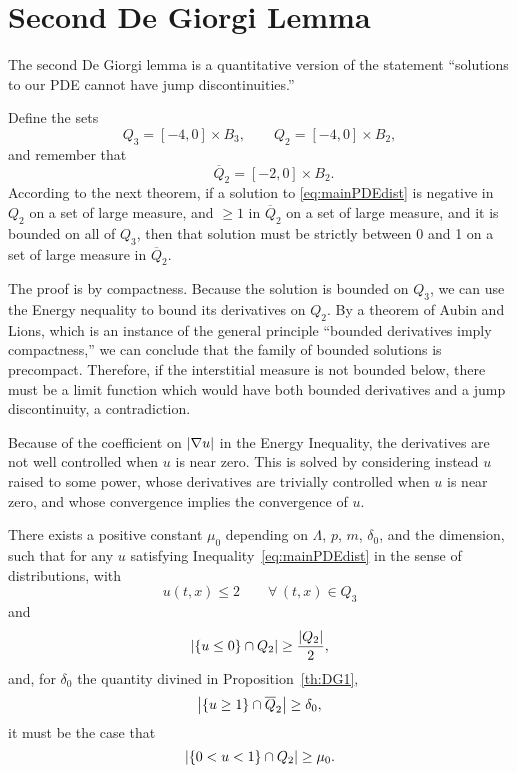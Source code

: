 \section{Second De Giorgi Lemma} \label{sec:DG2}


The second De Giorgi lemma is a quantitative version of the statement ``solutions to our PDE cannot have jump discontinuities.''  

Define the sets
\[ Q_3 = [-4,0]\times B_3, \qquad Q_2 = [-4,0]\times B_2, \]
and remember that 
\[ \qquad \overline{Q}_2 = [-2,0]\times B_2.\]  
According to the next theorem, if a solution to \eqref{eq:mainPDEdist} is negative in $Q_2$ on a set of large measure, and $\geq 1$ in $\overline{Q}_2$ on a set of large measure, and it is bounded on all of $Q_3$, then that solution must be strictly between 0 and 1 on a set of large measure in $\overline{Q}_2$.  

The proof is by compactness.  Because the solution is bounded on $Q_3$, we can use the Energy nequality to bound its derivatives on $Q_2$.  By a theorem of Aubin and Lions, which is an instance of the general principle ``bounded derivatives imply compactness,'' we can conclude that the family of bounded solutions is precompact.  Therefore, if the interstitial measure is not bounded below, there must be a limit function which would have both bounded derivatives and a jump discontinuity, a contradiction.  

Because of the coefficient on $|\nabla u|$ in the Energy Inequality, the derivatives are not well controlled when $u$ is near zero.  This is solved by considering instead $u$ raised to some power, whose derivatives are trivially controlled when $u$ is near zero, and whose convergence implies the convergence of $u$.  

\begin{proposition}\label{th:DG2}
There exists a positive constant $\mu_0$ depending on $\Lambda$, $p$, $m$, $\delta_0$, and the dimension, such that for any $u$
satisfying Inequality~\eqref{eq:mainPDEdist} in the sense of distributions, with 
\[ u(t,x) \leq 2 \qquad \forall\,(t,x) \in Q_3\]
and
\[\left\lvert \{u \leq 0\} \cap Q_2 \right\rvert \geq \frac{\left\lvert Q_2 \right\rvert}{2},\] 
and, for $\delta_0$ the quantity divined in Proposition~\ref{th:DG1},
\[ \left\lvert \{u \geq 1\} \cap \overline{Q}_2 \right\rvert \geq \delta_0,\]  
it must be the case that
\[ \left\lvert \{0 < u < 1\} \cap Q_2 \right\rvert \geq \mu_0.\]  
\end{proposition}


